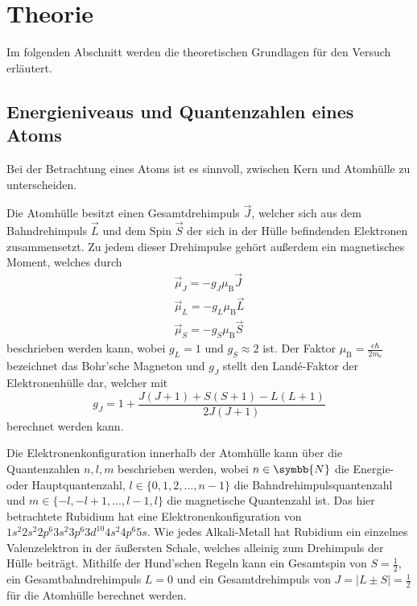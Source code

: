 \section{Theorie}
\label{sec:theorie}

    Im folgenden Abschnitt werden die theoretischen Grundlagen für den Versuch erläutert.

\subsection{Energieniveaus und Quantenzahlen eines Atoms}
\label{sec:energieaufspaltung}

    Bei der Betrachtung eines Atoms ist es sinnvoll,
    zwischen Kern und Atomhülle zu unterscheiden.

    Die Atomhülle besitzt einen Gesamtdrehimpuls $\vec{J}$,
    welcher sich aus dem Bahndrehimpuls $\vec{L}$ und dem Spin $\vec{S}$ der sich in der Hülle befindenden Elektronen zusammensetzt.
    Zu jedem dieser Drehimpulse gehört außerdem ein magnetisches Moment,
    welches durch
    \begin{gather}
        \vec{\mu}_J = -g_J \mu_\text{B} \vec{J} \\
        \vec{\mu}_L = -g_L \mu_\text{B} \vec{L} \\
        \vec{\mu}_S = -g_S \mu_\text{B} \vec{S}
    \end{gather}
    beschrieben werden kann,
    wobei $g_L = 1$ und $g_S \approx 2$ ist.
    Der Faktor $\mu_\text{B} = \frac{e \hbar}{2m_\text{e}}$ bezeichnet das Bohr'sche Magneton und $g_J$ stellt den Landé-Faktor der Elektronenhülle dar,
    welcher mit
    \begin{equation}
        g_J = 1 + \frac{J(J+1) + S(S+1) - L(L+1)}{2J(J+1)}
        \label{eqn:landeJ}
    \end{equation}
    berechnet werden kann.

    Die Elektronenkonfiguration innerhalb der Atomhülle kann über die Quantenzahlen $n, l, m$ beschrieben werden,
    wobei $n \in \symbb{N}$ die Energie- oder Hauptquantenzahl,
    $l \in \{0, 1, 2, ..., n-1\}$ die Bahndrehimpulsquantenzahl und $m \in \{-l, -l+1, ..., l-1, l\}$ die magnetische Quantenzahl ist.
    Das hier betrachtete Rubidium hat eine Elektronenkonfiguration von $1s^2 2s^2 2p^6 3s^2 3p^6 3d^{10} 4s^2 4p^6 5s$.
    Wie jedes Alkali-Metall hat Rubidium ein einzelnes Valenzelektron in der äußersten Schale,
    welches alleinig zum Drehimpuls der Hülle beiträgt.
    Mithilfe der Hund'schen Regeln kann ein Gesamtspin von $S=\frac{1}{2}$,
    ein Gesamtbahndrehimpuls $L=0$ und ein Gesamtdrehimpuls von $J = \lvert L \pm S \rvert = \frac{1}{2}$ für die Atomhülle berechnet werden.

